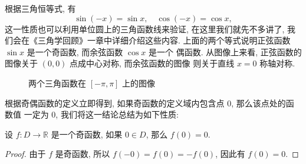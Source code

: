 \documentclass[10pt,UTF8]{book} %
\begin{document}
\begin{example}
    根据三角恒等式, 有
    \[ \sin(-x) = \sin x, \quad 
    \cos(-x) = \cos x, \]
    这一性质也可以利用单位圆上的三角函数线来验证, 在这里我们就先不多讲了,
    我们会在《三角学回顾》一章中详细介绍这些内容.
    上面的两个等式说明正弦函数 $\sin x$ 是一个奇函数, 而余弦函数 $\cos x$ 是一个
    偶函数. 从图像上来看, 正弦函数的图像关于 $(0,0)$ 点成中心对称, 而余弦函数的图像
    则关于直线 $x=0$ 称轴对称.
    \begin{figure}[H]
        \centering
        \begin{minipage}{0.4\textwidth}
            \centering
        \end{minipage}
        \begin{minipage}{0.4\textwidth}
            \centering
        \end{minipage}
        \caption{两个三角函数在 $[-\pi,\pi]$ 上的图像}
    \end{figure}
\end{example}

根据奇偶函数的定义立即得到, 如果奇函数的定义域内包含点 $0$, 那么该点处的函数值
一定为 $0$, 我们将这一结论总结为如下性质:
\setcounter{property}{0}
\begin{property}
    设 $f: D \to \mathbb{R}$ 是一个奇函数, 如果 $0 \in D$, 那么
    $f(0) = 0$.
    \begin{proof}
        由于 $f$ 是奇函数, 所以 $f(-0)= f(0) = -f(0)$, 因此有 $f(0)=0$.
    \end{proof}
\end{property}
\end{document}
